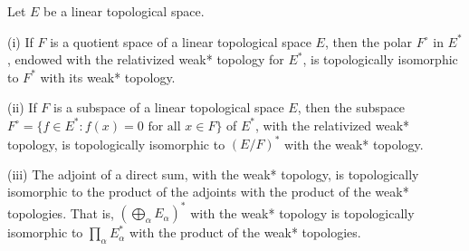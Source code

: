 Let $E$ be a linear topological space.

(i) If $F$ is a quotient space of a linear topological space $E$, then the polar $F^\circ$ in $E^*$, endowed with the relativized weak* topology for $E^*$, is topologically isomorphic to $F^*$ with its weak* topology.

(ii) If $F$ is a subspace of a linear topological space $E$, then the subspace $F^\circ = \{f \in E^* : f(x) = 0 \text{ for all } x \in F\}$ of $E^*$, with the relativized weak* topology, is topologically isomorphic to $(E/F)^*$ with the weak* topology.

(iii) The adjoint of a direct sum, with the weak* topology, is topologically isomorphic to the product of the adjoints with the product of the weak* topologies. That is, $(\bigoplus_\alpha E_\alpha)^*$ with the weak* topology is topologically isomorphic to $\prod_\alpha E_\alpha^*$ with the product of the weak* topologies.
